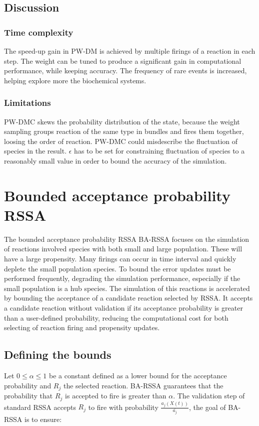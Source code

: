   

  \subsection{Discussion}

    \subsubsection{Time complexity}
    The speed-up gain in PW-DM is achieved by multiple firings of a reaction in each step.
    The weight can be tuned to produce a significant gain in computational performance, while keeping accuracy.
    The frequency of rare events is increased, helping explore more the biochemical systems.

    \subsubsection{Limitations}
    PW-DMC skews the probability distribution of the state, because the weight sampling groups reaction of the same type in bundles and fires them together, loosing the order of reaction.
    PW-DMC could misdescribe the fluctuation of species in the result.
    $\epsilon$ has to be set for constraining fluctuation of species to a reasonably small value in order to bound the accuracy of the simulation.

\section{Bounded acceptance probability RSSA}
The bounded acceptance probability RSSA BA-RSSA focuses on the simulation of reactions involved species with both small and large population.
These will have a large propensity.
Many firings can occur in time interval and quickly deplete the small population species.
To bound the error updates must be performed frequently, degrading the simulation performance, especially if the small population is a hub species.
The simulation of this reactions is accelerated by bounding the acceptance of a candidate reaction selected by RSSA.
It accepts a candidate reaction without validation if its acceptance probability is greater than a user-defined probability, reducing the computational cost for both selecting of reaction firing and propensity updates.

  \subsection{Defining the bounds}
  Let $0\le\alpha\le 1$ be a constant defined as a lower bound for the acceptance probability and $R_j$ the selected reaction.
  BA-RSSA guarantees that the probability that $R_j$ is accepted to fire is greater than $\alpha$.
  The validation step of standard RSSA accepts $R_j$ to fire with probability $\frac{a_j(X(t))}{\overline{a_j}}$, the goal of BA-RSSA is to ensure:

